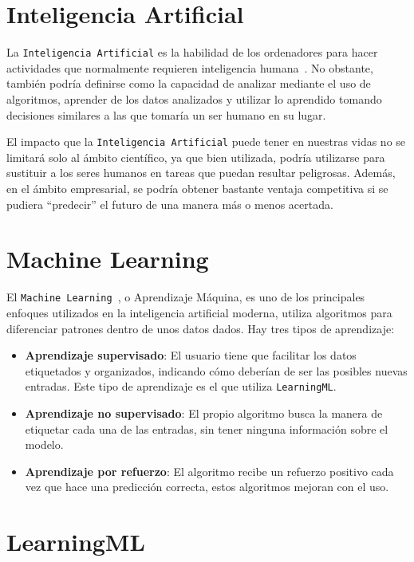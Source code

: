 \documentclass[a4paper, 12pt]{book}
\begin{document}
\section{Inteligencia Artificial}
\label{sec:ia}

La \texttt{Inteligencia Artificial} es la habilidad de los ordenadores para hacer actividades que normalmente requieren inteligencia humana~\cite{rouhiainen2018inteligencia}. No obstante, también podría definirse como la capacidad de analizar mediante el uso de algoritmos, aprender de los datos analizados y utilizar lo aprendido tomando decisiones similares a las que tomaría un ser humano en su lugar.

El impacto que la \texttt{Inteligencia Artificial} puede tener en nuestras vidas no se limitará solo al ámbito científico, ya que bien utilizada, podría utilizarse para sustituir a los seres humanos en tareas que puedan resultar peligrosas. Además, en el ámbito empresarial, se podría obtener bastante ventaja competitiva si se pudiera ``predecir'' el futuro de una manera más o menos acertada.

\section{Machine Learning}
\label{sec:machine-learning}

El \texttt{Machine Learning}~\cite{rouhiainen2018inteligencia}, o Aprendizaje Máquina, es uno de los principales enfoques utilizados en la inteligencia artificial moderna, utiliza algoritmos para diferenciar patrones dentro de unos datos dados. Hay tres tipos de aprendizaje:

\begin{itemize}
	\item \textbf{Aprendizaje supervisado}: El usuario tiene que facilitar los datos etiquetados y organizados, indicando cómo deberían de ser las posibles nuevas entradas. Este tipo de aprendizaje es el que utiliza \texttt{LearningML}.
	\item \textbf{Aprendizaje no supervisado}: El propio algoritmo busca la manera de etiquetar cada una de las entradas, sin tener ninguna información sobre el modelo.
	\item \textbf{Aprendizaje por refuerzo}: El algoritmo recibe un refuerzo positivo cada vez que hace una predicción correcta, estos algoritmos mejoran con el uso.
\end{itemize}

\section{LearningML}
\label{sec:learningml}
\end{document}
